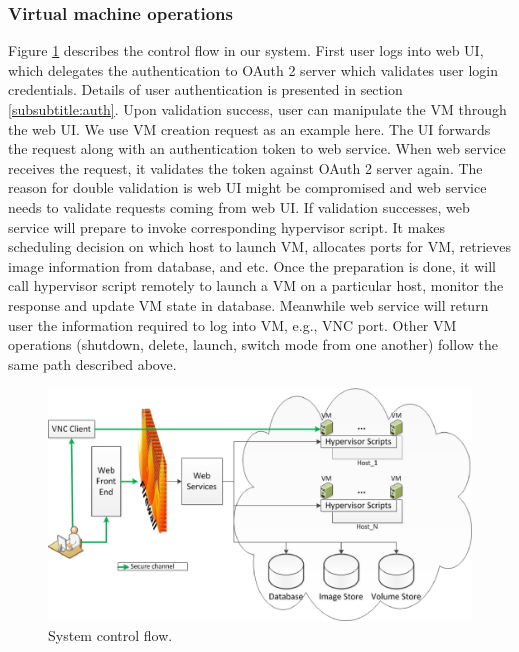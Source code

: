 \documentclass{acm_proc_article-sp}
\begin{document}
\subsubsection{Virtual machine operations} \label{subsubtitle:control}
Figure \ref{fig:control} describes the control flow in our system. First user logs into web UI, which delegates the authentication to OAuth 2 server which validates user login credentials. Details of user authentication is presented in section \ref{subsubtitle:auth}. Upon validation success, user can manipulate the VM through the web UI. We use VM creation request as an example here. The UI forwards the request along with an authentication token to web service. When web service receives the request, it validates the token against OAuth 2 server again. The reason for double validation is web UI might be compromised and web service needs to validate requests coming from web UI. If validation successes, web service will prepare to invoke corresponding hypervisor script. It makes scheduling decision on which host to launch VM, allocates ports for VM, retrieves image information from database, and etc. Once the preparation is done, it will call hypervisor script remotely to launch a VM on a particular host, monitor the response and update VM state in database. Meanwhile web service will return user the information required to log into VM, e.g., VNC port. Other VM operations (shutdown, delete, launch, switch mode from one another) follow the same path described above.

\begin{figure}[ht]
  \centering
  \includegraphics[scale=0.35]{figures/workflow-control}
  \caption{System control flow.}
  \label{fig:control}
\end{figure}
\end{document}
